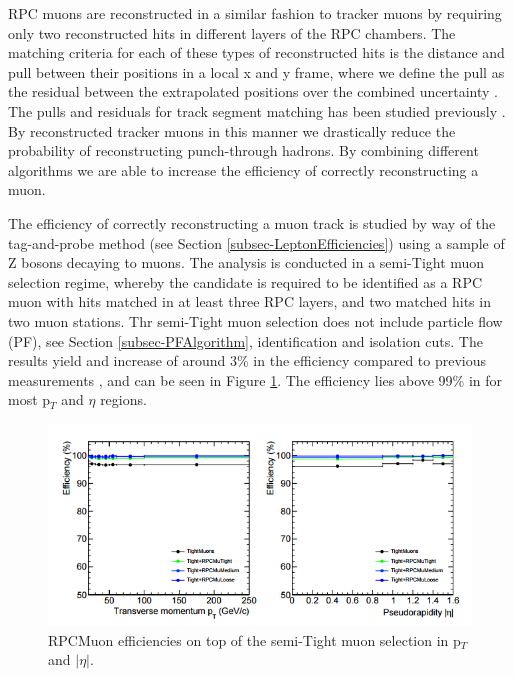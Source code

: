 RPC muons are reconstructed in a similar fashion to tracker muons by requiring only two reconstructed hits in different layers of the RPC chambers. The matching criteria for each of these types of reconstructed hits is the distance and pull between their positions in a local x and y frame, where we define the pull as the residual between the extrapolated positions over the combined uncertainty \cite{MUO-12-482}. The pulls and residuals for track segment matching has been studied previously \cite{Chatrchyan:2013sba}. By reconstructed tracker muons in this manner we drastically reduce the probability of reconstructing punch-through hadrons. By combining different algorithms we are able to increase the efficiency of correctly reconstructing a muon.

The efficiency of correctly reconstructing a muon track is studied by way of the tag-and-probe method (see Section \ref{subsec-LeptonEfficiencies}) using a sample of Z bosons decaying to muons. The analysis is conducted in a semi-Tight muon selection regime, whereby the candidate is required to be identified as a RPC muon with hits matched in at least three RPC layers, and two matched hits in two muon stations. Thr semi-Tight muon selection does not include particle flow (PF), see Section \ref{subsec-PFAlgorithm}, identification and isolation cuts. The results yield and increase of around 3\% in the efficiency compared to previous measurements \cite{MUO-12-482}, and can be seen in Figure \ref{fig-MuonEfficiencies}. The efficiency lies above 99\% in for most p$_T$ and $\eta$ regions. 

\begin{figure} 
\begin{center}
\includegraphics[width=\textwidth]{Figures/MuonEfficiencies.png}
\end{center}
\caption{RPCMuon efficiencies on top of the semi-Tight muon selection in p$_T$ and $|\eta|$. \cite{MUO-12-482}}
\label{fig-MuonEfficiencies}
\end{figure}


